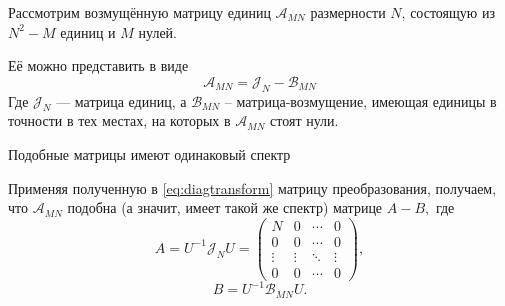 Рассмотрим возмущённую матрицу единиц
\( \mathscr{A}_{MN} \) размерности \( N \),
состоящую из \( N^2 - M \) единиц и \( M \) нулей.

Её можно представить в виде
\[
    \mathscr{A}_{MN} = \mathscr{J}_{N} - \mathscr{B}_{MN}
    \]
Где \( \mathscr{J}_{N} \) --- матрица единиц,
а \( \mathscr{B}_{MN} \) -- матрица-возмущение,
имеющая единицы в точности в тех местах,
на которых в \( \mathscr{A}_{MN} \) стоят нули.

\begin{prop}
    Подобные матрицы имеют одинаковый спектр
\end{prop}

Применяя полученную в \eqref{eq:diagtransform} матрицу преобразования,
получаем, что \( \mathscr{A}_{MN} \) подобна (а значит, имеет такой же спектр)
матрице
\( A - B, \)
где
\[
    A = {U^{-1}}{\mathscr{J}_{N}}{U}
    = \begin{pmatrix}
      N      & 0      & \cdots & 0 \\
      0      & 0      & \cdots & 0 \\
      \vdots & \vdots & \ddots & \vdots \\
      0      & 0      & \cdots & 0
        \end{pmatrix},
        \]
\[
    B = {U^{-1}}{\mathscr{B}_{MN}}{U}.
    \]
